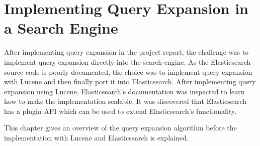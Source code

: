 \chapter{Implementing Query Expansion in a Search Engine}
\label{ch:approach}
After implementing query expansion in the project report,
the challenge was to implement query expansion directly into the search engine.
As the Elasticsearch source code is poorly documented,
the choice was to implement query expansion with Lucene and then finally port it into Elasticsearch.
After implementing query expansion using Lucene,
Elasticsearch's documentation was inspected to learn how to make the implementation scalable.
It was discovered that Elasticsearch has a plugin API which can be used to extend Elasticsearch's functionality.

This chapter gives an overview of the query expansion algorithm before the implementation with Lucene and Elasticsearch is explained.


